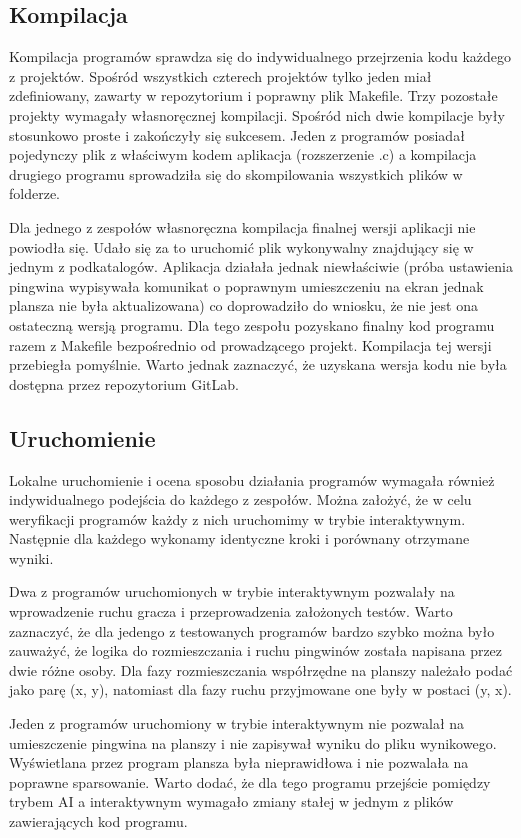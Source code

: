 \subsection{Kompilacja}

Kompilacja programów sprawdza się do indywidualnego przejrzenia kodu każdego z projektów.
Spośród wszystkich czterech projektów tylko jeden miał zdefiniowany, zawarty w repozytorium i poprawny plik Makefile.
Trzy pozostałe projekty wymagały własnoręcznej kompilacji.
Spośród nich dwie kompilacje były stosunkowo proste i zakończyły się sukcesem.
Jeden z programów posiadał pojedynczy plik z właściwym kodem aplikacja (rozszerzenie .c) a kompilacja drugiego programu sprowadziła się do skompilowania wszystkich plików w folderze.

Dla jednego z zespołów własnoręczna kompilacja finalnej wersji aplikacji nie powiodła się.
Udało się za to uruchomić plik wykonywalny znajdujący się w jednym z podkatalogów.
Aplikacja działała jednak niewłaściwie (próba ustawienia pingwina wypisywała komunikat o poprawnym umieszczeniu na ekran jednak plansza nie była aktualizowana) co doprowadziło do wniosku, że nie jest ona ostateczną wersją programu.
Dla tego zespołu pozyskano finalny kod programu razem z Makefile bezpośrednio od prowadzącego projekt.
Kompilacja tej wersji przebiegła pomyślnie.
Warto jednak zaznaczyć, że uzyskana wersja kodu nie była dostępna przez repozytorium GitLab.

\subsection{Uruchomienie}

Lokalne uruchomienie i ocena sposobu działania programów wymagała również indywidualnego podejścia do każdego z zespołów.
Można założyć, że w celu weryfikacji programów każdy z nich uruchomimy w trybie interaktywnym.
Następnie dla każdego wykonamy identyczne kroki i porównany otrzymane wyniki.

Dwa z programów uruchomionych w trybie interaktywnym pozwalały na wprowadzenie ruchu gracza i przeprowadzenia założonych testów.
Warto zaznaczyć, że dla jedengo z testowanych programów bardzo szybko można było zauważyć, że logika do rozmieszczania i ruchu pingwinów została napisana przez dwie różne osoby.
Dla fazy rozmieszczania współrzędne na planszy należało podać jako parę (x, y), natomiast dla fazy ruchu przyjmowane one były w postaci (y, x).

Jeden z programów uruchomiony w trybie interaktywnym nie pozwalał na umieszczenie pingwina na planszy i nie zapisywał wyniku do pliku wynikowego.
Wyświetlana przez program plansza była nieprawidłowa i nie pozwalała na poprawne sparsowanie.
Warto dodać, że dla tego programu przejście pomiędzy trybem AI a interaktywnym wymagało zmiany stałej w jednym z plików zawierających kod programu.

